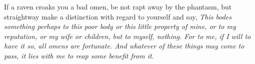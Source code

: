 If  a raven  croaks you  a bad  omen, be  not rapt  away by  the phantasm,  but
straightway  make a  distinction with  regard to  yourself and  say, \emph{This
bodes something perhaps to  this poor body or this little  property of mine, or
to my reputation, or my wife or children, but to myself, nothing. For to me, if
I will to have it so, all omens are fortunate. And whatever of these things may
come to pass, it lies with me to reap some benefit from it.}
